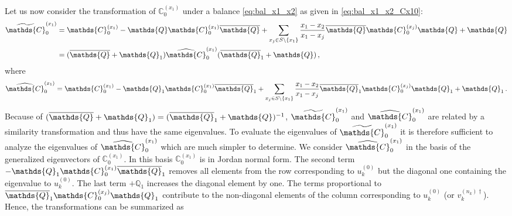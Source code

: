 \documentclass[12pt]{article}
\numberwithin{equation}{section}
\numberwithin{figure}{section}
\newcommand{\C}{\mathds{C}}
\newcommand{\Q}{\mathds{Q}}
\newcommand{\Qbar}{\overline\Q}
\begin{document}
        Let us now consider the transformation of $\C^{(x_1)}_0$ under a balance \eqref{eq:bal_x1_x2} as given in \eqref{eq:bal_x1_x2_Cx10}:
        \begin{align*}
          \widetilde \C^{(x_1)}_0 
          &=
          \C^{(x_1)}_0
          -
          \Q \C^{(x_1)}_0 \Qbar 
          +
          \sum\limits_{x_j\in S\backslash\{x_1\}} 
          \frac{x_1-x_2}{x_1-x_j} 
          \Qbar \C^{(x_j)}_0 \Q
          + \Q \\
          &=
          (\Qbar + \Q_1) \widehat \C^{(x_1)}_0 (\Qbar_1 + \Q)\,,
        \end{align*}
        where
        \[
          \widehat \C^{(x_1)}_0 
          =
          \C^{(x_1)}_0
          -
          \Q_1 \C_0^{(x_1)} \Qbar_1
          +
          \sum\limits_{x_j\in S\backslash\{x_1\}} 
          \frac{x_1-x_2}{x_1-x_j} 
          \Qbar_1 \C^{(x_j)}_0 \Q_1
          + \Q_1\,.
        \]            
        Because of $(\Qbar + \Q_1) = (\Qbar_1 + \Q)^{-1}$, $\widetilde \C^{(x_1)}_0$ and $\widehat \C^{(x_1)}_0$ are related by a similarity transformation and thus have the same eigenvalues.
				To evaluate the eigenvalues of $\widetilde \C^{(x_1)}_0$ it is therefore sufficient to analyze the eigenvalues of $\widehat \C^{(x_1)}_0$ which are much simpler to determine.
        We consider $\widehat\C^{(x_1)}_0$ in the basis of the generalized eigenvectors of $\C^{(x_1)}_0$.
        In this basis $\C^{(x_1)}_0$ is in Jordan normal form.
        The second term $-\Q_1 \C_0^{(x_1)} \Qbar_1$ removes all elements from the row corresponding to $u_k^{(0)}$ but the diagonal one containing the eigenvalue to $u_k^{(0)}$.
        The last term $+\Q_1$ increases the diagonal element by one.
        The terms proportional to $\Qbar_1 \C_0^{(x_j)} \Q_1$ contribute to the non-diagonal elements of the column corresponding to $u_k^{(0)}$ (or $v_k^{(n_k)\dagger}$).
        Hence, the transformations can be summarized as 
\end{document}
